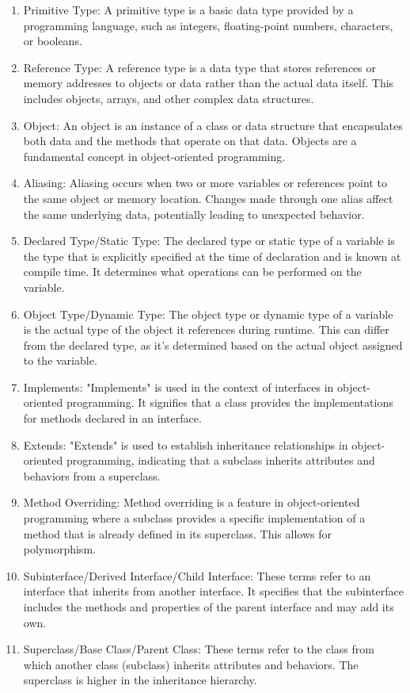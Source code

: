 \documentclass{article}
\begin{document}
\begin{enumerate}
\begin{enumerate}
    \item Primitive Type: A primitive type is a basic data type provided by a programming language, such as integers, floating-point numbers, characters, or booleans.
    \item Reference Type: A reference type is a data type that stores references or memory addresses to objects or data rather than the actual data itself. This includes objects, arrays, and other complex data structures.
    \item Object: An object is an instance of a class or data structure that encapsulates both data and the methods that operate on that data. Objects are a fundamental concept in object-oriented programming.
    \item Aliasing: Aliasing occurs when two or more variables or references point to the same object or memory location. Changes made through one alias affect the same underlying data, potentially leading to unexpected behavior.
    \item Declared Type/Static Type: The declared type or static type of a variable is the type that is explicitly specified at the time of declaration and is known at compile time. It determines what operations can be performed on the variable.
    \item Object Type/Dynamic Type: The object type or dynamic type of a variable is the actual type of the object it references during runtime. This can differ from the declared type, as it's determined based on the actual object assigned to the variable.
    \item Implements: "Implements" is used in the context of interfaces in object-oriented programming. It signifies that a class provides the implementations for methods declared in an interface.
    \item Extends: "Extends" is used to establish inheritance relationships in object-oriented programming, indicating that a subclass inherits attributes and behaviors from a superclass.
    \item Method Overriding: Method overriding is a feature in object-oriented programming where a subclass provides a specific implementation of a method that is already defined in its superclass. This allows for polymorphism.
    \item Subinterface/Derived Interface/Child Interface: These terms refer to an interface that inherits from another interface. It specifies that the subinterface includes the methods and properties of the parent interface and may add its own.
    \item Superclass/Base Class/Parent Class: These terms refer to the class from which another class (subclass) inherits attributes and behaviors. The superclass is higher in the inheritance hierarchy.

\end{enumerate}
\end{enumerate}
\end{document}
